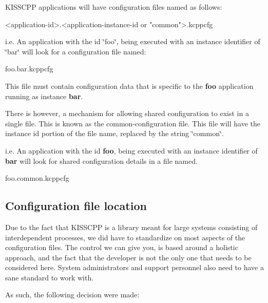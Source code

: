 K\-I\-S\-S\-C\-P\-P applications will have configuration files named as follows\-:


\begin{DoxyCode}
<application-\textcolor{keywordtype}{id}>.<application-instance-\textcolor{keywordtype}{id} or \textcolor{stringliteral}{"common"}>.kcppcfg
\end{DoxyCode}


i.\-e. An application with the id \char`\"{}foo\char`\"{}, being executed with an instance identifier of \char`\"{}bar\char`\"{} will look for a configuration file named\-:


\begin{DoxyCode}
foo.bar.kcppcfg
\end{DoxyCode}


This file must contain configuration data that is specific to the {\bfseries foo} application running as instance {\bfseries bar}.

There is however, a mechanism for allowing shared configuration to exist in a single file. This is known as the common-\/configuration file. This file will have the instance id portion of the file name, replaced by the string \char`\"{}common\char`\"{}.

i.\-e. An application with the id {\bfseries foo}, being executed with an instance identifier of {\bfseries bar} will look for shared configuration details in a file named.


\begin{DoxyCode}
foo.common.kcppcfg
\end{DoxyCode}


\subsection*{Configuration file location}

Due to the fact that K\-I\-S\-S\-C\-P\-P is a library meant for large systems consisting of interdependent processes, we did have to standardize on most aspects of the configuration files. The control we can give you, is based around a holistic approach, and the fact that the developer is not the only one that needs to be considered here. System administrators and support personnel also need to have a sane standard to work with.

As such, the following decision were made\-:


